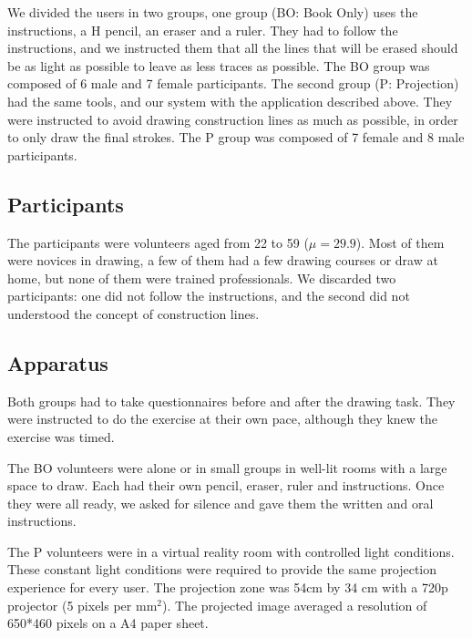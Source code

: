 \documentclass{sigchi}
\begin{document}
   We divided the users in two groups, one group (BO: Book Only) uses the
   instructions, a H pencil, an eraser and a ruler. They had to
   follow the instructions, and we instructed them that all the lines
   that will be erased should be as light as possible to leave as less
   traces as possible. The BO group was composed of 6 male and 7
   female participants.
   The second group (P: Projection) had the same tools, and our system
   with the application described above. 
   They were instructed to avoid drawing construction lines as much as
   possible, in order to only draw the final strokes. The P group was
   composed of 7 female and 8 male participants. 

 \subsection{Participants}

   The participants were volunteers aged from 22 to 59
   ($\mu=29.9$). Most of them were novices in drawing, a few of them
   had a few drawing courses or draw at home, but none of them were
   trained professionals. We discarded two participants: one did not
   follow the instructions, and the second did not understood the
   concept of construction lines. 

\subsection{Apparatus}



  Both groups had to take questionnaires before and after the drawing
  task. They were instructed to do the exercise at their own pace,
  although they knew the exercise was timed. 

  The BO volunteers were alone or in small groups in well-lit rooms
  with a large space to draw. Each had their own pencil, eraser, ruler
  and instructions. Once they were all ready, we asked for silence and
  gave them the written and oral instructions. 

  The P volunteers were in a virtual reality room with controlled
  light conditions. These constant light conditions were required to
  provide the same projection experience for every user. 
  The projection zone was  54cm by 34 cm with a 720p projector (5
  pixels per mm$^2$). The projected image averaged a resolution of
  650*460 pixels on a A4 paper sheet.
\end{document}
